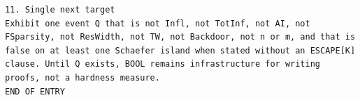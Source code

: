 \documentclass[11pt]{article}
\begin{document}
\begin{Verbatim}[breaklines=true,breakanywhere=true]
11. Single next target
Exhibit one event Q that is not Infl, not TotInf, not AI, not FSparsity, not ResWidth, not TW, not Backdoor, not n or m, and that is false on at least one Schaefer island when stated without an ESCAPE[K] clause. Until Q exists, BOOL remains infrastructure for writing proofs, not a hardness measure.
END OF ENTRY
\end{Verbatim}
\end{document}

